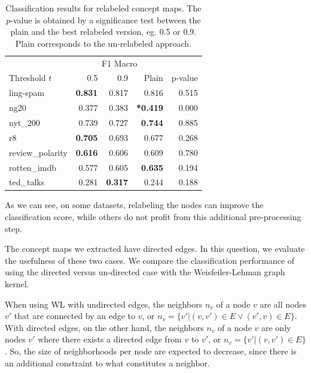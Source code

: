 \begin{table}[htb!]
	\centering
	\begin{tabular}{lrrrr}
\toprule
		{} & \multicolumn{3}{c}{F1 Macro} &  \\
		Threshold $t$ &         0.5 &   0.9 & Plain & p-value \\
		\midrule
		ling-spam       & \textbf{0.831} & 0.817 & 0.816 & 0.515 \\
		ng20            & 0.377 & 0.383 & \textbf{*0.419} & 0.000 \\
		nyt\_200         & 0.739 & 0.727 & \textbf{0.744} & 0.885 \\
		r8              & \textbf{0.705} & 0.693 & 0.677 & 0.268 \\
		review\_polarity & \textbf{0.616} & 0.606 & 0.609 & 0.780 \\
		rotten\_imdb     & 0.577 & 0.605 & \textbf{0.635} & 0.194 \\
		ted\_talks       & 0.281 & \textbf{0.317} & 0.244 & 0.188 \\
		\bottomrule
	\end{tabular}
	\caption[Results: Merge infrequent nodes]{Classification results for relabeled concept maps. The $p$-value is obtained by a significance test between the plain and the best relabeled version, eg. 0.5 or 0.9. Plain corresponds to the un-relabeled approach.	}
	\label{table:results_infrequent_relabeled}
\end{table}

As we can see, on some datasets, relabeling the nodes can improve the classification score, while others do not profit from this additional pre-processing step.


The concept maps we extracted have directed edges.
In this question, we evaluate the usefulness of these two cases.
We compare the classification performance of using the directed versus un-directed case with the Weisfeiler-Lehman graph kernel.

When using WL with undirected edges, the neighbors $n_v$ of a node $v$ are all nodes $v'$ that are connected by an edge to $v$, or $n_v = \{v' | (v, v') \in E \lor (v', v ) \in E \}$.
With directed edges, on the other hand, the neighbors $n_v$ of a node $v$ are only nodes $v'$ where there exists a directed edge from $v$ to $v'$, or $n_v = \{v' | (v, v') \in E \}$.
So, the size of neighborhoods per node are expected to decrease, since there is an additional constraint to what constitutes a neighbor.


